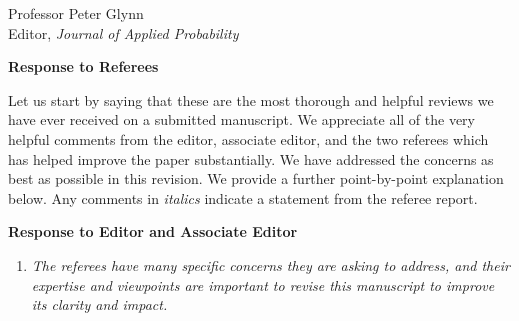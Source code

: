 \documentclass[11pt]{letter} %
\begin{document}

\begin{letter}{Professor
	Peter Glynn\\
	Editor, {\em Journal of Applied Probability}}



\signature{Walter Dempsey\\
University of Michigan\\
Department of Biostatistics\\
1415 Washington Heights\\
Ann Arbor, MI 48103} %


\vspace{5mm}

\newpage

{\bf Response to Referees}

Let us start by saying that these are the most thorough and helpful reviews we have ever received on a submitted manuscript.  We appreciate all of the very helpful comments from the editor, associate editor, and the two referees which has helped improve the paper substantially. We have addressed the concerns as best as possible in this revision. We provide a further point-by-point explanation below. Any comments in {\it italics} indicate a statement from the referee report.

{\bf Response to Editor and Associate Editor}
\begin{enumerate}
\item {\it The referees have many specific concerns they are asking to address, and their expertise and viewpoints are important to revise this manuscript to improve its clarity and impact.}


\end{enumerate}
\end{letter}
\end{document}
